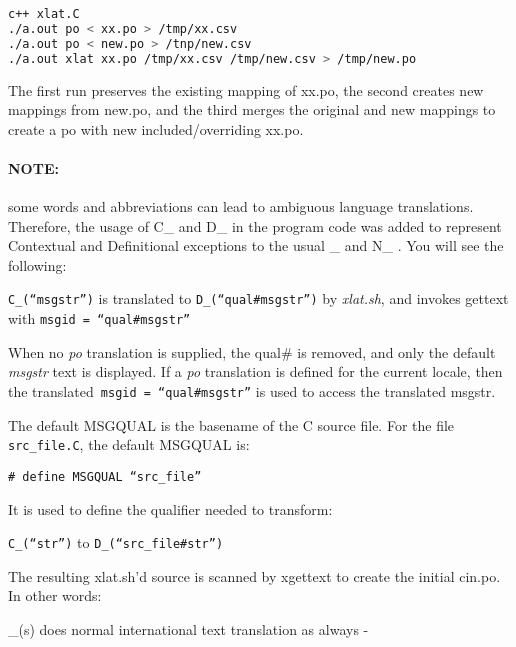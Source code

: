 \begin{lstlisting}[language=bash]
c++ xlat.C
./a.out po < xx.po > /tmp/xx.csv
./a.out po < new.po > /tnp/new.csv
./a.out xlat xx.po /tmp/xx.csv /tmp/new.csv > /tmp/new.po
\end{lstlisting}

The first run preserves the existing mapping of xx.po, the second creates new mappings from new.po, and the third merges the original and new mappings to create a po with new included/overriding xx.po.

\paragraph{NOTE:} some words and abbreviations can lead to ambiguous language translations.  Therefore, the usage of C\_ and D\_ in the program code was added to represent Contextual and Definitional exceptions to the usual \_ and N\_ .  You will see the following:

\vspace{2ex} \texttt{C\_(“msgstr”)}  is translated to \texttt{D\_(“qual\#msgstr”)} by \textit{xlat.sh}, and invokes gettext with \texttt{msgid = “qual\#msgstr”}

\vspace{2ex} When no \textit{po} translation is supplied, the qual\# is removed, and only the default \textit{msgstr} text is displayed.   If a \textit{po} translation is defined for the current locale, then the translated\texttt{ msgid = “qual\#msgstr”} is used to access the translated msgstr.

\vspace{2ex} \noindent The default MSGQUAL is the basename of the C source file.  For the file \texttt{src\_file.C}, the default MSGQUAL is:

\vspace{2ex} \texttt{\# define MSGQUAL “src\_file”}

\vspace{2ex} \noindent It is used to define the qualifier needed to transform:

\vspace{2ex} \texttt{C\_(“str”)} to \texttt{D\_(“src\_file\#str”)}

\vspace{2ex} \noindent The resulting xlat.sh'd source is scanned by xgettext to create the initial cin.po.  In other words:

\vspace{2ex} \_(s) does normal international text translation as always -

